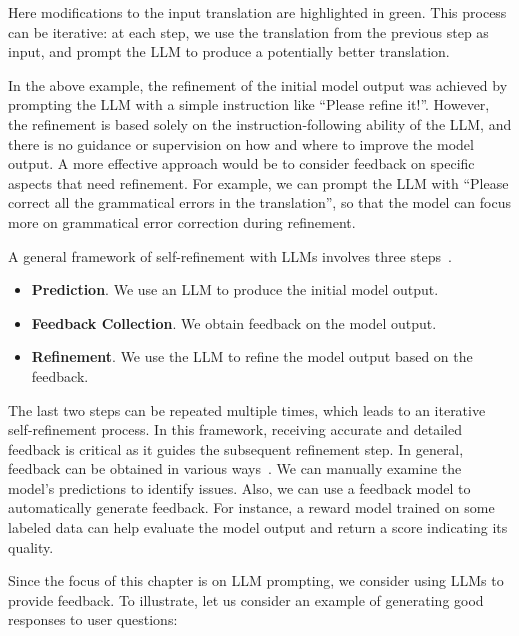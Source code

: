 \noindent Here modifications to the input translation are highlighted in green. This process can be iterative: at each step, we use the translation from the previous step as input, and prompt the LLM to produce a potentially better translation.

In the above example, the refinement of the initial model output was achieved by prompting the LLM with a simple instruction like ``Please refine it!''. However, the refinement is based solely on the instruction-following ability of the LLM, and there is no guidance or supervision on how and where to improve the model output. A more effective approach would be to consider feedback on specific aspects that need refinement. For example, we can prompt the LLM with ``Please correct all the grammatical errors in the translation'', so that the model can focus more on grammatical error correction during refinement.

A general framework of self-refinement with LLMs involves three steps~\cite{madaan-etal:2024self}.

\begin{itemize}
\item \vspace{0.5em} \textbf{Prediction}. We use an LLM to produce the initial model output.
\item \vspace{0.2em} \textbf{Feedback Collection}. We obtain feedback on the model output.
\item \vspace{0.2em} \textbf{Refinement}. We use the LLM to refine the model output based on the feedback.
\end{itemize}
\vspace{0.5em}

The last two steps can be repeated multiple times, which leads to an iterative self-refinement process. In this framework, receiving accurate and detailed feedback is critical as it guides the subsequent refinement step. In general, feedback can be obtained in various ways~\cite{fernandes-etal:2023bridging,pan-etal:2024automatically}. We can manually examine the model's predictions to identify issues. Also, we can use a feedback model to automatically generate feedback. For instance, a reward model trained on some labeled data can help evaluate the model output and return a score indicating its quality.

Since the focus of this chapter is on LLM prompting, we consider using LLMs to provide feedback. To illustrate, let us consider an example of generating good responses to user questions:


